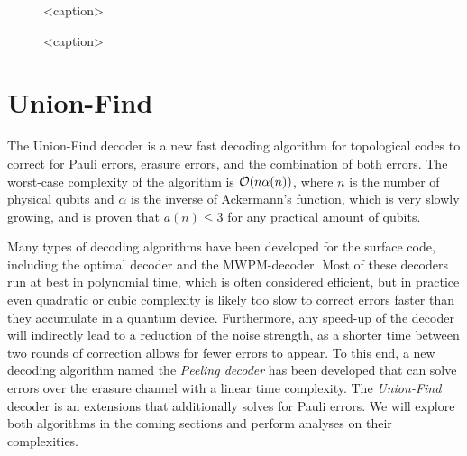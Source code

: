 \begin{figure}[ht]
  \centering
  \begin{subfigure}[b]{\textwidth}
    
  \end{subfigure}
  \begin{subfigure}[b]{\textwidth}
    
  \end{subfigure}
  \caption{<caption>}
  \label{fig:thres_mwpm_2d}
\end{figure}
\begin{figure}[ht]
  \centering
  \begin{subfigure}[b]{\textwidth}
    
  \end{subfigure}
  \begin{subfigure}[b]{\textwidth}
    
  \end{subfigure}
  \caption{<caption>}
  \label{fig:thres_mwpm_3d}
\end{figure}



\section{Union-Find}\label{sec:UFdecoder}

The Union-Find decoder is a new fast decoding algorithm for topological codes to correct for Pauli errors, erasure errors, and the combination of both errors. The worst-case complexity of the algorithm is $\mathcal{O}(n\alpha(n))$, where $n$ is the number of physical qubits and $\alpha$ is the inverse of Ackermann's function, which is very slowly growing, and is proven that $a(n)\leq 3$ for any practical amount of qubits.

Many types of decoding algorithms have been developed for the surface code, including the optimal decoder and the MWPM-decoder. Most of these decoders run at best in polynomial time, which is often considered efficient, but in practice even quadratic or cubic complexity is likely too slow to correct errors faster than they accumulate in a quantum device. Furthermore, any speed-up of the decoder will indirectly lead to a reduction of the noise strength, as a shorter time between two rounds of correction allows for fewer errors to appear. To this end, a new decoding algorithm named the \emph{Peeling decoder} has been developed that can solve errors over the erasure channel with a linear time complexity. The \emph{Union-Find} decoder is an extensions that additionally solves for Pauli errors. We will explore both algorithms in the coming sections and perform analyses on their complexities.


